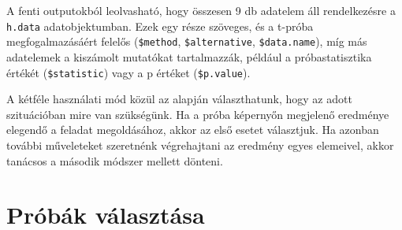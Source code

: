 \documentclass[
]{book}
\newenvironment{Shaded}{\begin{snugshade}}{\end{snugshade}}
\newcommand{\CommentTok}[1]{\textcolor[rgb]{0.56,0.35,0.01}{\textit{#1}}}
\newcommand{\FunctionTok}[1]{\textcolor[rgb]{0.00,0.00,0.00}{#1}}
\newcommand{\NormalTok}[1]{#1}
\begin{document}
\begin{Shaded}
\end{Shaded}

A fenti outputokból leolvasható, hogy összesen 9 db adatelem áll rendelkezésre a \texttt{h.data} adatobjektumban. Ezek egy része szöveges, és a t-próba megfogalmazásáért felelős (\texttt{\$method}, \texttt{\$alternative}, \texttt{\$data.name}), míg más adatelemek a kiszámolt mutatókat tartalmazzák, például a próbastatisztika értékét (\texttt{\$statistic}) vagy a p értéket (\texttt{\$p.value}).

A kétféle használati mód közül az alapján választhatunk, hogy az adott szituációban mire van szükségünk. Ha a próba képernyőn megjelenő eredménye elegendő a feladat megoldásához, akkor az első esetet választjuk. Ha azonban további műveleteket szeretnénk végrehajtani az eredmény egyes elemeivel, akkor tanácsos a második módszer mellett dönteni.

\hypertarget{pruxf3buxe1k-vuxe1lasztuxe1sa}{%
\section{Próbák választása}\label{pruxf3buxe1k-vuxe1lasztuxe1sa}}
\end{document}
